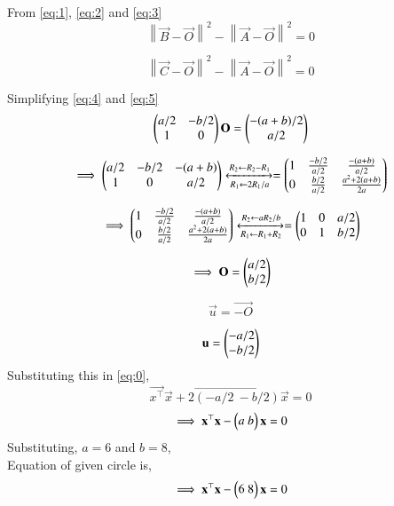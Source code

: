 \documentclass[journal,12pt,twocolumn]{IEEEtran}
\begin{document}
From \ref{eq:1}, \ref{eq:2} and \ref{eq:3}
\\
\begin{equation}
    \left\lVert {\vec{B}-\vec{O}}\right\rVert^2 - \left\lVert {\vec{A}-\vec{O}}\right\rVert^2= 0 \label{eq:4}
\end{equation}

\begin{equation}
\left\lVert {\vec{C}-\vec{O}}\right\rVert^2 - \left\lVert {\vec{A}-\vec{O}}\right\rVert^2= 0 \label{eq:5}
\end{equation}


Simplifying \ref{eq:4} and \ref{eq:5}
\begin{equation}
    \begin{pmatrix}a/2 & -b/2 \\ 1 & 0\end{pmatrix}\mathbf{O}= \begin{pmatrix}-(a+b)/2 \\ a/2\end{pmatrix}
\end{equation}



\begin{equation}
\implies \begin{pmatrix}a/2 & -b/2 & -(a+b) \\ 1 & 0 & a/2\end{pmatrix}
\xleftrightarrow [R_1\leftarrow 2R_1/a]{R_2\leftarrow R_2-R_1}
=
\begin{pmatrix}1 & \frac{-b/2}{a/2} & \frac{-(a+b)}{a/2} \\ 0& \frac{b/2}{a/2} & \frac{a^2+2(a+b)}{2a}\end{pmatrix}
\end{equation}


\begin{equation}
  \implies \begin{pmatrix}1 & \frac{-b/2}{a/2} & \frac{-(a+b)}{a/2} \\ 0& \frac{b/2}{a/2} & \frac{a^2+2(a+b)}{2a}\end{pmatrix}
  \xleftrightarrow [R_1\leftarrow R_1+R_2]{R_2\leftarrow aR_2/b}
=
\begin{pmatrix}1 & 0 & a/2 \\ 0& 1 & b/2\end{pmatrix}
\end{equation}


\begin{equation}
    \implies \mathbf{O}=\begin{pmatrix}a/2 \\ b/2\end{pmatrix} 
\end{equation}

\begin{equation}
    \vec{u} = \vec{-O}
\end{equation}

\begin{equation}
    \mathbf{u} = \begin{pmatrix}-a/2\\-b/2\end{pmatrix}
\end{equation}
Substituting this in \ref{eq:0},
\begin{equation}
    \vec{x^\top}\vec{x}+2\vec{(-a/2 \ -b/2)}\vec{x}=0 
\end{equation}
\begin{equation}
   \implies \mathbf{x^\top}\mathbf{x}-\begin{pmatrix}a \ b \end{pmatrix}\mathbf{x}=0
\end{equation}
Substituting, $a=6$ and $b=8$,\\
Equation of given circle is,
\begin{equation}
   \implies \mathbf{x^\top}\mathbf{x}-\begin{pmatrix}6 \ 8 \end{pmatrix}\mathbf{x}=0
\end{equation}
\end{document}
